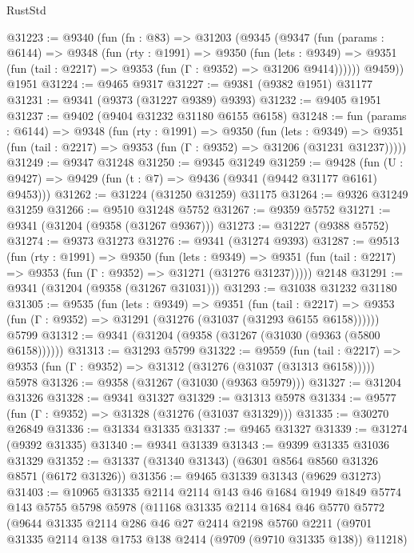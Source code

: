 \begin{lexlean}{RustStd}
\begin{coremodule}
@31223 := @9340
    (fun (fn : @83) =>
    @31203
      (@9345
        (@9347
          (fun (params : @6144) =>
          @9348
            (fun (rty : @1991) =>
            @9350
              (fun (lets : @9349) =>
              @9351 (fun (tail : @2217) => @9353 (fun (Γ : @9352) => @31206 @9414))))))
        @9459))
    @1951
@31224 := @9465 @9317
@31227 := @9381 (@9382 @1951) @31177
@31231 := @9341 (@9373 (@31227 @9389) @9393)
@31232 := @9405 @1951
@31237 := @9402 (@9404 @31232 @31180 @6155 @6158)
@31248 := fun (params : @6144) =>
  @9348
    (fun (rty : @1991) =>
    @9350
      (fun (lets : @9349) =>
      @9351 (fun (tail : @2217) => @9353 (fun (Γ : @9352) => @31206 (@31231 @31237)))))
@31249 := @9347 @31248
@31250 := @9345 @31249
@31259 := @9428
    (fun (U : @9427) => @9429 (fun (t : @7) => @9436 (@9341 (@9442 @31177 @6161) @9453)))
@31262 := @31224 (@31250 @31259) @31175
@31264 := @9326 @31249 @31259
@31266 := @9510 @31248 @5752
@31267 := @9359 @5752
@31271 := @9341 (@31204 (@9358 (@31267 @9367)))
@31273 := @31227 (@9388 @5752)
@31274 := @9373 @31273
@31276 := @9341 (@31274 @9393)
@31287 := @9513
    (fun (rty : @1991) =>
    @9350
      (fun (lets : @9349) =>
      @9351 (fun (tail : @2217) => @9353 (fun (Γ : @9352) => @31271 (@31276 @31237)))))
    @2148
@31291 := @9341 (@31204 (@9358 (@31267 @31031)))
@31293 := @31038 @31232 @31180
@31305 := @9535
    (fun (lets : @9349) =>
    @9351
      (fun (tail : @2217) =>
      @9353 (fun (Γ : @9352) => @31291 (@31276 (@31037 (@31293 @6155 @6158))))))
    @5799
@31312 := @9341 (@31204 (@9358 (@31267 (@31030 (@9363 (@5800 @6158))))))
@31313 := @31293 @5799
@31322 := @9559
    (fun (tail : @2217) => @9353 (fun (Γ : @9352) => @31312 (@31276 (@31037 (@31313 @6158)))))
    @5978
@31326 := @9358 (@31267 (@31030 (@9363 @5979)))
@31327 := @31204 @31326
@31328 := @9341 @31327
@31329 := @31313 @5978
@31334 := @9577 (fun (Γ : @9352) => @31328 (@31276 (@31037 @31329)))
@31335 := @30270 @26849
@31336 := @31334 @31335
@31337 := @9465 @31327
@31339 := @31274 (@9392 @31335)
@31340 := @9341 @31339
@31343 := @9399 @31335 @31036 @31329
@31352 := @31337 (@31340 @31343) (@6301 @8564 @8560 @31326 @8571 (@6172 @31326))
@31356 := @9465 @31339 @31343 (@9629 @31273)
@31403 := @10965
    @31335
    @2114
    @2114
    @143
    @46
    @1684
    @1949
    @1849
    @5774
    @143
    @5755
    @5798
    @5978
    (@11168
      @31335
      @2114
      @1684
      @46
      @5770
      @5772
      (@9644
        @31335
        @2114
        @286
        @46
        @27
        @2414
        @2198
        @5760
        @2211
        (@9701 @31335 @2114 @138 @1753 @138 @2414 (@9709 (@9710 @31335 @138)) @11218)

\end{coremodule}
\end{lexlean}
